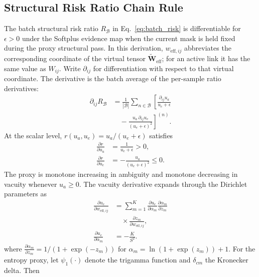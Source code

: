 \documentclass[letterpaper]{article}
\begin{document}
\subsection{Structural Risk Ratio Chain Rule}
\label{app:r_chain}
The batch structural risk ratio $R_{\mathcal B}$ in Eq.~\ref{eq:batch_risk} is differentiable for $\epsilon>0$ under the Softplus evidence map when the current mask is held fixed during the proxy structural pass. In this derivation, $w_{\text{eff},ij}$ abbreviates the corresponding coordinate of the virtual tensor $\widetilde{\bm W}_{\text{eff}}$; for an active link it has the same value as $W_{ij}$. Write $\partial_{ij}$ for differentiation with respect to that virtual coordinate. The derivative is the batch average of the per-sample ratio derivatives:
\begin{equation}
\begin{aligned}
    \partial_{ij}R_{\mathcal B}
    &=\frac{1}{|\mathcal B|}\sum_{n\in\mathcal B}
    \left[\frac{\partial_{ij}u_a}{u_e+\epsilon}\right.\\
    &\left.\quad-\frac{u_a\,\partial_{ij}u_e}
    {(u_e+\epsilon)^2}\right]^{(n)}.
\end{aligned}
\end{equation}
At the scalar level, $r(u_a,u_e)=u_a/(u_e+\epsilon)$ satisfies
\begin{equation*}
\begin{aligned}
    \frac{\partial r}{\partial u_a}&=\frac{1}{u_e+\epsilon}>0,\\
    \frac{\partial r}{\partial u_e}&=-\frac{u_a}{(u_e+\epsilon)^2}\le0.
\end{aligned}
\end{equation*}
The proxy is monotone increasing in ambiguity and monotone decreasing in vacuity whenever $u_a\ge0$.
The vacuity derivative expands through the Dirichlet parameters as
\begin{equation}
\begin{aligned}
    \frac{\partial u_e}{\partial w_{\mathrm{eff},ij}}
    &=\sum_{m=1}^{K}
    \frac{\partial u_e}{\partial\alpha_m}
    \frac{\partial\alpha_m}{\partial z_m}\\
    &\quad\times\frac{\partial z_m}{\partial w_{\mathrm{eff},ij}},\\
    \frac{\partial u_e}{\partial\alpha_m}&=-\frac{K}{S^2}.
\end{aligned}
\end{equation}
where $\frac{\partial \alpha_m}{\partial z_m}=1/(1+\exp(-z_m))$ for $\alpha_m=\ln(1+\exp(z_m))+1$. For the entropy proxy, let $\psi_1(\cdot)$ denote the trigamma function and $\delta_{cm}$ the Kronecker delta. Then
\end{document}
